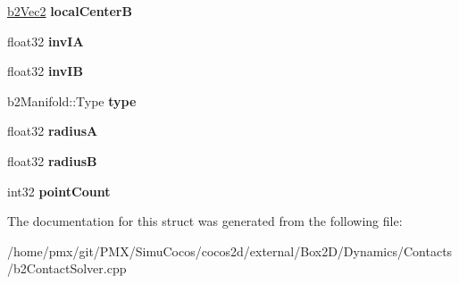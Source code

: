 \begin{DoxyCompactItemize}
\hyperlink{structb2Vec2}{b2\+Vec2} {\bfseries local\+CenterB}
\item 
\mbox{\label{structb2ContactPositionConstraint_aaf92ebfd9ee6f7734199e7cf65441fdb}} 
float32 {\bfseries inv\+IA}
\item 
\mbox{\label{structb2ContactPositionConstraint_a942566765748c8daf934a051457f4b0f}} 
float32 {\bfseries inv\+IB}
\item 
\mbox{\label{structb2ContactPositionConstraint_a09f96db1c3fe5ede24395e2431e95103}} 
b2\+Manifold\+::\+Type {\bfseries type}
\item 
\mbox{\label{structb2ContactPositionConstraint_ae75232327a6d37b0c36c2a8e12ef08b2}} 
float32 {\bfseries radiusA}
\item 
\mbox{\label{structb2ContactPositionConstraint_a066db66f0b944b92c2666271e88e4540}} 
float32 {\bfseries radiusB}
\item 
\mbox{\label{structb2ContactPositionConstraint_a98c9f0e1e7041ed2b15370ed713b84fc}} 
int32 {\bfseries point\+Count}
\end{DoxyCompactItemize}


The documentation for this struct was generated from the following file\+:\begin{DoxyCompactItemize}
\item 
/home/pmx/git/\+P\+M\+X/\+Simu\+Cocos/cocos2d/external/\+Box2\+D/\+Dynamics/\+Contacts/b2\+Contact\+Solver.\+cpp\end{DoxyCompactItemize}
